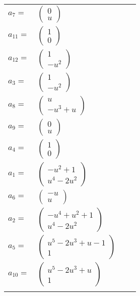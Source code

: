 \documentclass[1p]{elsarticle_modified}
\theoremstyle{definition}
\begin{document}
\begin{tabular}{m{7pt} m{180pt} m{7pt} m{180pt} }
\flushright $a_{7}=$&$\begin{pmatrix}0\\u\end{pmatrix}$ \\
\flushright $a_{11}=$&$\begin{pmatrix}1\\0\end{pmatrix}$ \\
\flushright $a_{12}=$&$\begin{pmatrix}1\\- u^2\end{pmatrix}$ \\
\flushright $a_{3}=$&$\begin{pmatrix}1\\- u^2\end{pmatrix}$ \\
\flushright $a_{8}=$&$\begin{pmatrix}u\\- u^3+u\end{pmatrix}$ \\
\flushright $a_{9}=$&$\begin{pmatrix}0\\u\end{pmatrix}$ \\
\flushright $a_{4}=$&$\begin{pmatrix}1\\0\end{pmatrix}$ \\
\flushright $a_{1}=$&$\begin{pmatrix}- u^2+1\\u^4-2 u^2\end{pmatrix}$ \\
\flushright $a_{6}=$&$\begin{pmatrix}- u\\u\end{pmatrix}$ \\
\flushright $a_{2}=$&$\begin{pmatrix}- u^4+u^2+1\\u^4-2 u^2\end{pmatrix}$ \\
\flushright $a_{5}=$&$\begin{pmatrix}u^5-2 u^3+u-1\\1\end{pmatrix}$ \\
\flushright $a_{10}=$&$\begin{pmatrix}u^5-2 u^3+u\\1\end{pmatrix}$\\&\end{tabular}
\end{document}

